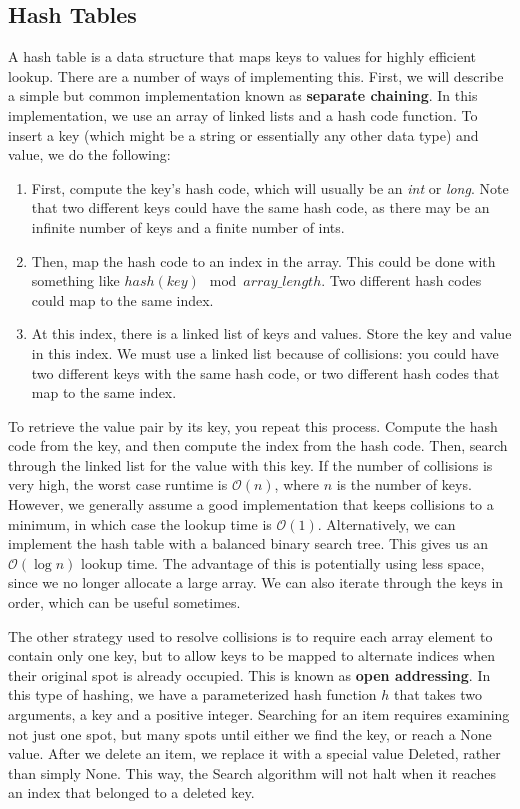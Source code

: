 \documentclass{article}
\newcommand{\bigO}{\ensuremath{\mathcal{O}}}
\begin{document}
    \subsection{Hash Tables}
    A hash table is a data structure that maps keys to values for highly efficient lookup. There are a number of ways of implementing this. First, we will describe a simple but common implementation known as \textbf{separate chaining}. In this implementation, we use an array of linked lists and a hash code function. To insert a key (which might be a string or essentially any other data type) and value, we do the following: 
    \begin{enumerate}
        \item 
        First, compute the key's hash code, which will usually be an \textit{int} or \textit{long}. Note that two different keys could have the same hash code, as there may be an infinite number of keys and a finite number of ints.
        \item
        Then, map the hash code to an index in the array. This could be done with something like $hash(key)\mod array\_length$. Two different hash codes could map to the same index.
        \item
        At this index, there is a linked list of keys and values. Store the key and value in this index. We must use a linked list because of collisions: you could have two different keys with the same hash code, or two different hash codes that map to the same index.
    \end{enumerate}
    To retrieve the value pair by its key, you repeat this process. Compute the hash code from the key, and then compute the index from the hash code. Then, search through the linked list for the value with this key. If the number of collisions is very high, the worst case runtime is $\bigO(n)$, where $n$ is the number of keys. However, we generally assume a good implementation that keeps collisions to a minimum, in which case the lookup time is $\bigO(1)$. Alternatively, we can implement the hash table with a balanced binary search tree. This gives us an $\bigO(\log n)$ lookup time. The advantage of this is potentially using less space, since we no longer allocate a large array. We can also iterate through the keys in order, which can be useful sometimes.

    The other strategy used to resolve collisions is to require each array element to contain only one key, but to allow keys to be mapped to alternate indices when their original spot is already occupied. This is known as \textbf{open addressing}. In this type of hashing, we have a parameterized hash function $h$ that takes two arguments, a key and a positive integer. Searching for an item requires examining not just one spot, but many spots until either we find the key, or reach a None value. After we delete an item, we replace it with a special value Deleted, rather than simply None. This way, the Search algorithm will not halt when it reaches an index that belonged to a deleted key.
    
\end{document}
